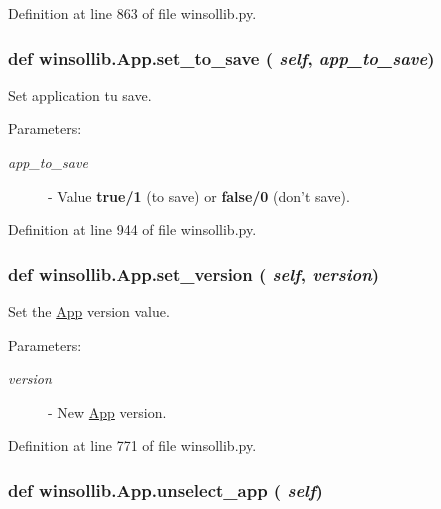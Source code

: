 Definition at line 863 of file winsollib.py.\hypertarget{classwinsollib_1_1App_360cce66bfaca9846415147efb464838}{
\subsubsection[set\_\-to\_\-save]{\setlength{\rightskip}{0pt plus 5cm}def winsollib.App.set\_\-to\_\-save ( {\em self},  {\em app\_\-to\_\-save})}}
\label{classwinsollib_1_1App_360cce66bfaca9846415147efb464838}


Set application tu save. 

\begin{Desc}
\item[Parameters:]
\begin{description}
\item[{\em app\_\-to\_\-save}]- Value {\bf true/1} (to save) or {\bf false/0} (don't save). \end{description}
\end{Desc}


Definition at line 944 of file winsollib.py.\hypertarget{classwinsollib_1_1App_4f59b1de4fdea104fe2e6143dd73596e}{
\subsubsection[set\_\-version]{\setlength{\rightskip}{0pt plus 5cm}def winsollib.App.set\_\-version ( {\em self},  {\em version})}}
\label{classwinsollib_1_1App_4f59b1de4fdea104fe2e6143dd73596e}


Set the \hyperlink{classwinsollib_1_1App}{App} version value. 

\begin{Desc}
\item[Parameters:]
\begin{description}
\item[{\em version}]- New \hyperlink{classwinsollib_1_1App}{App} version. \end{description}
\end{Desc}


Definition at line 771 of file winsollib.py.\hypertarget{classwinsollib_1_1App_10672006e430bec96065aff6fbbeadaa}{
\subsubsection[unselect\_\-app]{\setlength{\rightskip}{0pt plus 5cm}def winsollib.App.unselect\_\-app ( {\em self})}}
\label{classwinsollib_1_1App_10672006e430bec96065aff6fbbeadaa}


